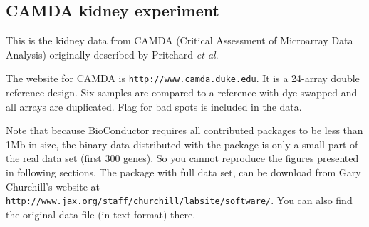 \subsection{CAMDA kidney experiment}
This is the kidney data from CAMDA (Critical Assessment 
of Microarray Data Analysis) originally described by Pritchard {\it et al}.

The website for CAMDA is 
{\tt http://www.camda.duke.edu}. It is a 24-array double reference
design. Six samples are compared to a reference with dye swapped
and all arrays are duplicated. Flag for bad spots is included in the 
data. 

Note that because BioConductor requires all contributed packages to be less
than 1Mb in size, the binary data distributed with the package
is only a small part of the real data set (first 300 genes). 
So you cannot reproduce the figures presented in following sections.
The package with full data set, can be download from
Gary Churchill's website
at {\tt http://www.jax.org/staff/churchill/labsite/software/}. 
You can also find the original data file (in text format) there.

